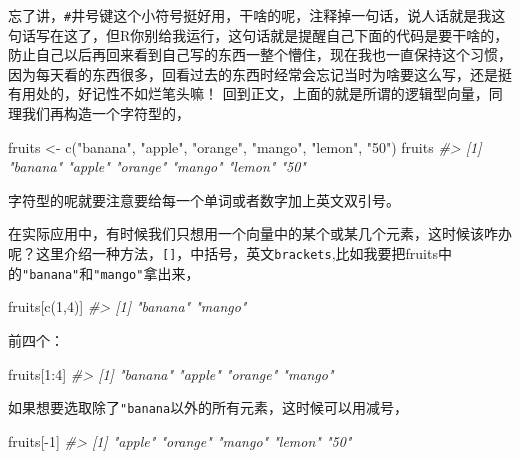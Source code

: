 \documentclass[
]{book}
\newenvironment{Shaded}{\begin{snugshade}}{\end{snugshade}}
\newcommand{\CommentTok}[1]{\textcolor[rgb]{0.56,0.35,0.01}{\textit{#1}}}
\newcommand{\DecValTok}[1]{\textcolor[rgb]{0.00,0.00,0.81}{#1}}
\newcommand{\FunctionTok}[1]{\textcolor[rgb]{0.00,0.00,0.00}{#1}}
\newcommand{\NormalTok}[1]{#1}
\newcommand{\OtherTok}[1]{\textcolor[rgb]{0.56,0.35,0.01}{#1}}
\newcommand{\SpecialCharTok}[1]{\textcolor[rgb]{0.00,0.00,0.00}{#1}}
\newcommand{\StringTok}[1]{\textcolor[rgb]{0.31,0.60,0.02}{#1}}
\begin{document}
忘了讲，\texttt{\#}井号键这个小符号挺好用，干啥的呢，注释掉一句话，说人话就是我这句话写在这了，但R你别给我运行，这句话就是提醒自己下面的代码是要干啥的，防止自己以后再回来看到自己写的东西一整个懵住，现在我也一直保持这个习惯，因为每天看的东西很多，回看过去的东西时经常会忘记当时为啥要这么写，还是挺有用处的，好记性不如烂笔头嘛！
回到正文，上面的就是所谓的逻辑型向量，同理我们再构造一个字符型的，

\begin{Shaded}
\begin{Highlighting}[]
\NormalTok{fruits }\OtherTok{\textless{}{-}} \FunctionTok{c}\NormalTok{(}\StringTok{"banana"}\NormalTok{, }\StringTok{"apple"}\NormalTok{, }\StringTok{"orange"}\NormalTok{, }\StringTok{"mango"}\NormalTok{, }\StringTok{"lemon"}\NormalTok{, }\StringTok{"50"}\NormalTok{)}
\NormalTok{fruits}
\CommentTok{\#\textgreater{} [1] "banana" "apple"  "orange" "mango"  "lemon"  "50"}
\end{Highlighting}
\end{Shaded}

字符型的呢就要注意要给每一个单词或者数字加上英文双引号。

在实际应用中，有时候我们只想用一个向量中的某个或某几个元素，这时候该咋办呢？这里介绍一种方法，\texttt{{[}{]}}，中括号，英文\texttt{brackets},比如我要把fruits中的\texttt{"banana"}和\texttt{"mango"}拿出来，

\begin{Shaded}
\begin{Highlighting}[]
\NormalTok{fruits[}\FunctionTok{c}\NormalTok{(}\DecValTok{1}\NormalTok{,}\DecValTok{4}\NormalTok{)]}
\CommentTok{\#\textgreater{} [1] "banana" "mango"}
\end{Highlighting}
\end{Shaded}

前四个：

\begin{Shaded}
\begin{Highlighting}[]
\NormalTok{fruits[}\DecValTok{1}\SpecialCharTok{:}\DecValTok{4}\NormalTok{]}
\CommentTok{\#\textgreater{} [1] "banana" "apple"  "orange" "mango"}
\end{Highlighting}
\end{Shaded}

如果想要选取除了\texttt{"banana}以外的所有元素，这时候可以用减号，

\begin{Shaded}
\begin{Highlighting}[]
\NormalTok{fruits[}\SpecialCharTok{{-}}\DecValTok{1}\NormalTok{]}
\CommentTok{\#\textgreater{} [1] "apple"  "orange" "mango"  "lemon"  "50"}
\end{Highlighting}
\end{Shaded}
\end{document}
